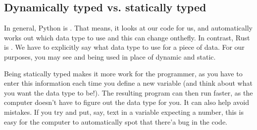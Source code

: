 \documentclass[letterpaper,10pt,british]{sphinxmanual}
\begin{document}
\subsection{Dynamically typed vs. statically typed}
\label{\detokenize{chapters/programming_fundamentals/data_types:dynamically-typed-vs-statically-typed}}
\sphinxAtStartPar
In general, Python is . That means, it looks at our code for us, and automatically works out which data type to use and this can change on\sphinxhyphen{}the\sphinxhyphen{}fly. In contrast, Rust is . We have to explicitly say what data type to use for a piece of data. For our purposes, you may see  and  being used in place of dynamic and static.

\sphinxAtStartPar
Being statically typed makes it more work for the programmer, as you have to enter this information each time you define a new variable (and think about what you want the data type to be!). The resulting program can then run faster, as the computer doesn’t have to figure out the data type for you. It can also help avoid mistakes. If you try and put, say, text in a variable expecting a number, this is easy for the computer to automatically spot that there’a bug in the code.
\end{document}
